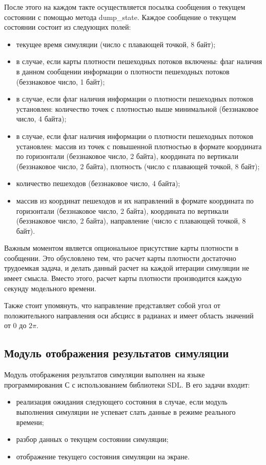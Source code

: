 После этого на каждом такте осуществляется посылка сообщения о текущем состоянии с помощью метода dump\_state.
Каждое сообщение о текущем состоянии состоит из следующих полей:
\begin{itemize}
  \item текущее время симуляции (число с плавающей точкой, 8 байт);
  \item в случае, если карты плотности пешеходных потоков включены: флаг наличия в данном сообщении информации о плотности пешеходных потоков (беззнаковое число, 1 байт);
  \item в случае, если флаг наличия информации о плотности пешеходных потоков установлен: количество точек с плотностью выше минимальной (беззнаковое число, 4 байта);
  \item в случае, если флаг наличия информации о плотности пешеходных потоков установлен: массив из точек с повышенной плотностью в формате
    координата по горизонтали (беззнаковое число, 2 байта), координата по вертикали (беззнаковое число, 2 байта), плотность (число с плавающей точкой, 8 байт);
  \item количество пешеходов (беззнаковое число, 4 байта);
  \item массив из координат пешеходов и их направлений в формате
    координата по горизонтали (беззнаковое число, 2 байта), координата по вертикали (беззнаковое число, 2 байта), направление (число с плавающей точкой, 8 байт).
\end{itemize}

Важным моментом является опциональное присутствие карты плотности в сообщении.
Это обусловлено тем, что расчет карты плотности достаточно трудоемкая задача, и делать данный расчет на каждой итерации симуляции не имеет смысла.
Вместо этого, расчет карты плотности производится каждую секунду модельного времени.

Также стоит упомянуть, что направление представляет собой угол от положительного направления оси абсцисс в радианах и имеет область значений от $0$ до $2\pi$.

\subsection{Модуль отображения результатов симуляции}
\label{sec:development:animator}

Модуль отображения результатов симуляции выполнен на языке программирования С с использованием библиотеки SDL.
В его задачи входит:
\begin{itemize}
  \item реализация ожидания следующего состояния в случае, если модуль выполнения симуляции не успевает слать данные в режиме реального времени;
  \item разбор данных о текущем состоянии симуляции;
  \item отображение текущего состояния симуляции на экране.
\end{itemize}

